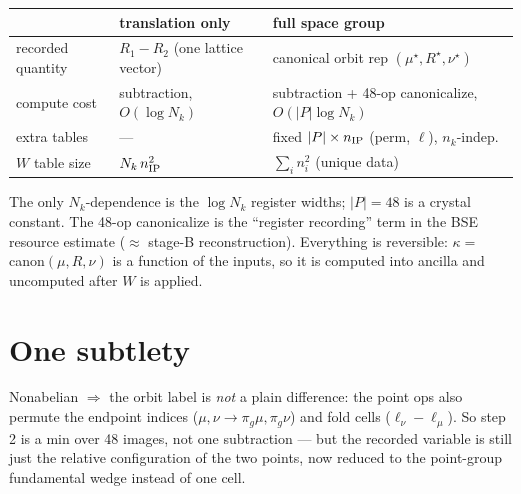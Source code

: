 \documentclass[11pt]{article}
\begin{document}
\begin{center}\begin{tabular}{lll}
\toprule
 & translation only & full space group\\\midrule
recorded quantity & $R_1-R_2$ (one lattice vector) & canonical orbit rep $(\mu^\star,R^\star,\nu^\star)$\\
compute cost & subtraction, $O(\log N_k)$ & subtraction + 48-op canonicalize, $O(|P|\log N_k)$\\
extra tables & --- & fixed $|P|\times n_{\rm IP}$ (perm, $\ell$), $n_k$-indep.\\
$W$ table size & $N_k\, n_{\rm IP}^2$ & $\sum_i n_i^2$ (unique data)\\
\bottomrule
\end{tabular}\end{center}

The only $N_k$-dependence is the $\log N_k$ register widths; $|P|=48$ is a crystal constant. The 48-op
canonicalize is the ``register recording'' term in the BSE resource estimate ($\approx$ stage-B
reconstruction). Everything is reversible: $\kappa=$ canon$(\mu,R,\nu)$ is a function of the inputs, so
it is computed into ancilla and uncomputed after $W$ is applied.

\section*{One subtlety}
Nonabelian $\Rightarrow$ the orbit label is \emph{not} a plain difference: the point ops also permute
the endpoint indices ($\mu,\nu\!\to\!\pi_g\mu,\pi_g\nu$) and fold cells ($\ell_\nu-\ell_\mu$). So step 2
is a min over 48 images, not one subtraction --- but the recorded variable is still just the relative
configuration of the two points, now reduced to the point-group fundamental wedge instead of one cell.
\end{document}
